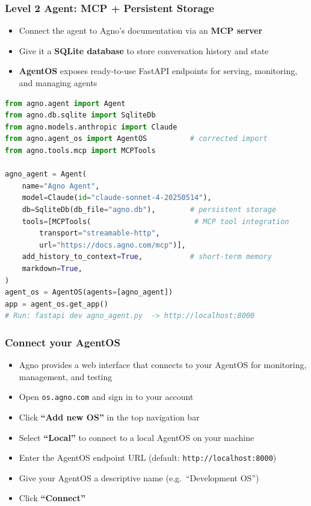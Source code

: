 \begin{frame}[fragile]\frametitle{Level 2 Agent: MCP + Persistent Storage}
      \begin{itemize}
        \item Connect the agent to Agno's documentation via an \textbf{MCP server}
        \item Give it a \textbf{SQLite database} to store conversation history and state
        \item \textbf{AgentOS} exposes ready-to-use FastAPI endpoints for serving, monitoring, and managing agents
      \end{itemize}
\begin{lstlisting}[language=python, basicstyle=\tiny]
from agno.agent import Agent
from agno.db.sqlite import SqliteDb
from agno.models.anthropic import Claude
from agno.agent_os import AgentOS          # corrected import
from agno.tools.mcp import MCPTools

agno_agent = Agent(
    name="Agno Agent",
    model=Claude(id="claude-sonnet-4-20250514"),
    db=SqliteDb(db_file="agno.db"),        # persistent storage
    tools=[MCPTools(                        # MCP tool integration
        transport="streamable-http",
        url="https://docs.agno.com/mcp")],
    add_history_to_context=True,           # short-term memory
    markdown=True,
)
agent_os = AgentOS(agents=[agno_agent])
app = agent_os.get_app()
# Run: fastapi dev agno_agent.py  -> http://localhost:8000
\end{lstlisting}
\end{frame}

\begin{frame}[fragile]\frametitle{Connect your AgentOS}
      \begin{itemize}
        \item Agno provides a web interface that connects to your AgentOS for monitoring, management, and testing
        \item Open \texttt{os.agno.com} and sign in to your account
        \item Click \textbf{``Add new OS''} in the top navigation bar
        \item Select \textbf{``Local''} to connect to a local AgentOS on your machine
        \item Enter the AgentOS endpoint URL (default: \texttt{http://localhost:8000})
        \item Give your AgentOS a descriptive name (e.g.\ ``Development OS'')
        \item Click \textbf{``Connect''}
      \end{itemize}
\end{frame}

